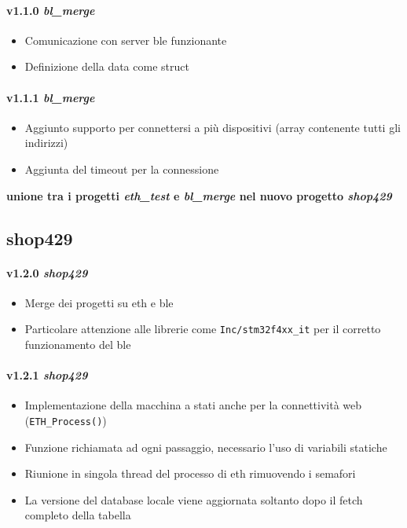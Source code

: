 \paragraph{v1.1.0 \textit{bl\_merge}}
	\begin{itemize}
		\item Comunicazione con server ble funzionante
		\item Definizione della data come struct
	\end{itemize}
\paragraph{v1.1.1 \textit{bl\_merge}}
	\begin{itemize}
		\item Aggiunto supporto per connettersi a pi\`{u} dispositivi (array contenente tutti gli indirizzi)
		\item Aggiunta del timeout per la connessione
	\end{itemize}

\textbf{unione tra i progetti \textit{eth\_test} e \textit{bl\_merge} nel nuovo progetto \textit{shop429}}

\subsection*{shop429}

\paragraph{v1.2.0 \textit{shop429}}
	\begin{itemize}
		\item Merge dei progetti su eth e ble
		\item Particolare attenzione alle librerie come \texttt{Inc/stm32f4xx\_it} per il corretto funzionamento del ble
	\end{itemize}
\paragraph{v1.2.1 \textit{shop429}}
	\begin{itemize}
		\item Implementazione della macchina a stati anche per la connettivit\`{a} web (\texttt{ETH\_Process()})
		\item Funzione richiamata ad ogni passaggio, necessario l'uso di variabili statiche
		\item Riunione in singola thread del processo di eth rimuovendo i semafori
		\item La versione del database locale viene aggiornata soltanto dopo il fetch completo della tabella
	\end{itemize}
